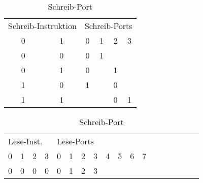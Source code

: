  
\begin{table}[]
	
	\begin{minipage}{.4\textwidth}
		\flushleft
		\label{schreib-port}
		\begin{tabular}{cccccc}
			\multicolumn{2}{l}{Schreib-Instruktion}                 & \multicolumn{4}{|l}{Schreib-Ports}                                                               \\ 
			\multicolumn{1}{c}{0} & \multicolumn{1}{c}{1} & \multicolumn{1}{|c}{0} & \multicolumn{1}{c}{1} & \multicolumn{1}{c}{2} & \multicolumn{1}{c}{3} \\ 
			\hline
			\multicolumn{1}{c}{0} & \multicolumn{1}{c}{0} & \multicolumn{1}{|c}{0} & \multicolumn{1}{c}{1} & \multicolumn{1}{c}{} & \multicolumn{1}{c}{} \\ 
			\multicolumn{1}{c}{0} & \multicolumn{1}{c}{1} & \multicolumn{1}{|c}{0} & \multicolumn{1}{c}{} & \multicolumn{1}{c}{1} & \multicolumn{1}{c}{} \\ 
			\multicolumn{1}{c}{1} & \multicolumn{1}{c}{0} & \multicolumn{1}{|c}{1} & \multicolumn{1}{c}{} & \multicolumn{1}{c}{0} & \multicolumn{1}{c}{} \\ 
			\multicolumn{1}{c}{1} & \multicolumn{1}{c}{1} & \multicolumn{1}{|c}{} & \multicolumn{1}{c}{} & \multicolumn{1}{c}{0} & \multicolumn{1}{c}{1}                    
		\end{tabular}
		\caption{Schreib-Port}
	\end{minipage}
	\hfill
	\begin{minipage}{.4\textwidth}
		\flushleft
		\label{lese-port}
		\begin{tabular}{cccccccccccccccccc}
			\multicolumn{4}{l}{Lese-Inst.}                 & \multicolumn{8}{|l}{Lese-Ports}                                                               \\ 
			\multicolumn{1}{c}{0} & \multicolumn{1}{c}{1} & \multicolumn{1}{c}{2} & \multicolumn{1}{c}{3} & \multicolumn{1}{|c}{0} & \multicolumn{1}{c}{1} & \multicolumn{1}{c}{2}& \multicolumn{1}{c}{3} &
			\multicolumn{1}{c}{4} & \multicolumn{1}{c}{5} & \multicolumn{1}{c}{6}& \multicolumn{1}{c}{7} \\
			\hline
            \multicolumn{1}{c}{0} & \multicolumn{1}{c}{0} & \multicolumn{1}{c}{0} & \multicolumn{1}{c}{0} & \multicolumn{1}{|c}{0} & \multicolumn{1}{c}{1} & \multicolumn{1}{c}{2}& \multicolumn{1}{c}{3} &
            \multicolumn{1}{c}{} & \multicolumn{1}{c}{} & \multicolumn{1}{c}{}& \multicolumn{1}{c}{} \\

\end{tabular}
\end{minipage}
\end{table}
